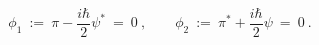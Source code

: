 \begin{equation}
\phi _{1}\ :=\ \pi -{\frac{i\hbar }{2}}\psi ^{\ast }\ =\ 0\ ,\qquad \phi
_{2}\ :=\ \pi ^{\ast }+{\frac{i\hbar }{2}}\psi \ =\ 0\ .  \label{primary}
\end{equation}%
